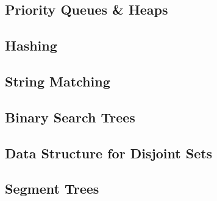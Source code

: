 \documentclass{article}
\begin{document}
\subsection{Priority Queues \& Heaps}
\subsection{Hashing}
\subsection{String Matching}
\subsection{Binary Search Trees}
\subsection{Data Structure for Disjoint Sets}
\subsection{Segment Trees}
\newpage

\end{document}
